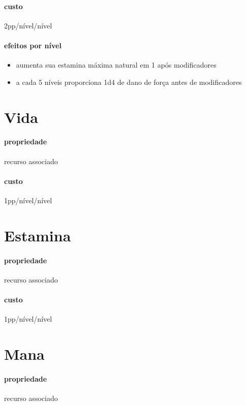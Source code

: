 \paragraph{custo} 2pp/nível/nível
\paragraph{efeitos por nível}
\begin{itemize}
  \item aumenta sua estamina máxima natural em 1 após modificadores
  \item a cada 5 níveis proporciona 1d4 de dano de força antes de modificadores
\end{itemize}
%
%
\section{Vida}
\paragraph{propriedade} recurso associado
\paragraph{custo} 1pp/nível/nível
%
%
\section{Estamina}
\paragraph{propriedade} recurso associado
\paragraph{custo} 1pp/nível/nível
%
%
\section{Mana}
\paragraph{propriedade} recurso associado
